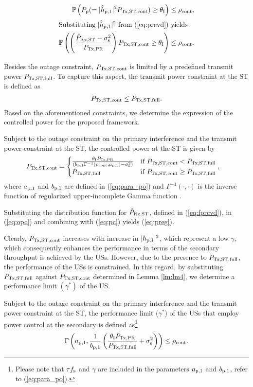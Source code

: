 \begin{align}
\mathbb P\left( P_{\text{p}}  (= |\hat{h}_{\text{p,1}}|^2 P_{\text{Tx,ST,cont}}) \ge \theta_{\text{I}} \right) \le \rho_{\text{cont}}, \nonumber \\
\intertext{Substituting $|\hat{h}_{\text{p,1}}|^2$ from (\ref{eq:prcvd}) yields}
\mathbb P\left( \left( \frac{\hat{P}_{\text{Rx,ST}} - \sigma^2_{\text{s}}}{P_{\text{Tx,PR}}}\right) P_{\text{Tx,ST,cont}} \ge \theta_{\text{I}} \right) \le \rho_{\text{cont}}. \label{eq:opc} \\[-1em] \nonumber 
\end{align}
Besides the outage constraint, $P_{\text{Tx,ST,cont}}$ is limited by a predefined transmit power $P_{\text{Tx,ST,full}}$. To capture this aspect, the transmit power constraint at the ST is defined as
\begin{align}
P_{\text{Tx,ST,cont}} \le P_{\text{Tx,ST,full}}. \label{eq:pc} 
\end{align} 
Based on the aforementioned constraints, we determine the expression of the controlled power for the proposed framework.
\begin{lemma} \label{lm:lm4}
\normalfont
Subject to the outage constraint on the primary interference and the transmit power constraint at the ST, the controlled power at the ST is given by
\begin{align}
P_{\text{Tx,ST,cont}} &= 
\begin{cases} 
\frac{\theta_{\text{I}} P_{\text{Tx,PR}}}{ \left(b_{\text{p,1}} \Gamma^{-1}(\rho_{\text{cont}}, a_{\text{p,1}}) - \sigma^2_{\text{s}}  \right)} & \mbox{if } P_{\text{Tx,ST,cont}} < P_{\text{Tx,ST,full}} \\
P_{\text{Tx,ST,full}} & \mbox{if } P_{\text{Tx,ST,cont}} \ge P_{\text{Tx,ST,full}}
\end{cases},
\label{eq:preg} 
\end{align}
where $a_{\text{p,1}}$ and $b_{\text{p,1}}$ are defined in (\ref{eq:para_po}) and $\Gamma^{-1}(\cdot, \cdot)$ is the inverse function of regularized upper-incomplete Gamma function \cite{abramo}.
\end{lemma} 
\begin{IEEEproof}
Substituting the distribution function for $\hat{P}_{\text{Rx,ST}}$, defined in (\ref{eq:fprcvd}), in (\ref{eq:opc}) and combining with (\ref{eq:pc}) yields (\ref{eq:preg}).
\end{IEEEproof}
Clearly, $P_{\text{Tx,ST,cont}}$ increases with increase in $|h_{\text{p,1}}|^2$, which represent a low $\gamma$, which consequently enhances the performance in terms of the secondary throughput is achieved by the USs. However, due to the presence to $P_{\text{Tx,ST,full}}$, the performance of the USs is constrained. In this regard, by substituting $P_{\text{Tx,ST,full}}$ against $P_{\text{Tx,ST,cont}}$ determined in Lemma \ref{lm:lm4}, we determine a performance limit $(\gamma^*)$ of the US. 
\begin{coro} \label{cor:cor1}
\normalfont
Subject to the outage constraint on the primary interference and the transmit power constraint at the ST, the performance limit ($\gamma^*$) of the USs that employ power control at the secondary is defined as\footnote{Please note that $\tau f_{\text{s}}$ and $\gamma$ are included in the parameters $a_{\text{p,1}}$ and $b_{\text{p,1}}$, refer to (\ref{eq:para_po}).} 
\begin{align}
\Gamma\left(a_{\text{p,1}}, \frac{1}{b_{\text{p,1}}} \left( \frac{\theta_{\text{I}} P_{\text{Tx,PR}}}{P_{\text{Tx,ST,full}}} + \sigma^2_{\text{s}}  \right)  \right) \le \rho_{\text{cont}}. \label{eq:opreg}  
\end{align}
\end{coro}

